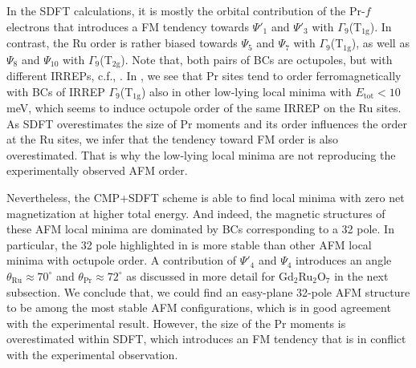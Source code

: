 \documentclass[10pt]{iopart}
\begin{document}
In the SDFT calculations, it is mostly the orbital contribution of the Pr-$f$ electrons that introduces a FM tendency towards $\Psi'_1$ and $\Psi'_3$ with $\Gamma_9$(T$_{1\mathrm{g}}$). In contrast, the Ru order is rather biased towards $\Psi_5$ and $\Psi_7$ with $\Gamma_9$(T$_{1\mathrm{g}}$), as well as $\Psi_8$ and $\Psi_{10}$ with $\Gamma_9$(T$_{2\mathrm{g}}$). Note that, both pairs of BCs are octupoles, but with different IRREPs, c.f., . In , we see that Pr sites tend to order ferromagnetically with BCs of IRREP $\Gamma_9$(T$_{1\mathrm{g}}$) also in other low-lying local minima with $E_{\mathrm{tot}} < 10\,$meV, which seems to induce octupole order of the same IRREP on the Ru sites. As SDFT overestimates the size of Pr moments and its order influences the order at the Ru sites, we infer that the tendency toward FM order is also overestimated.
That is why the low-lying local minima are not reproducing the experimentally observed AFM order.

Nevertheless, the CMP+SDFT scheme is able to find local minima with zero net magnetization at higher total energy. And indeed, the magnetic structures of these AFM local minima are dominated by BCs corresponding to a 32 pole. In particular, the 32 pole highlighted in  is more stable than other AFM local minima with octupole order. A contribution of $\Psi'_{4}$ and $\Psi_{4}$ introduces an angle $\theta_{\mathrm{Ru}}\approx70^{\circ}$ and $\theta_{\mathrm{Pr}}\approx72^{\circ}$ as discussed in more detail for Gd$_2$Ru$_2$O$_7$ in the next subsection. We conclude that, we could find an easy-plane 32-pole AFM structure to be among the most stable AFM configurations, which is in good agreement with the experimental result. However, the size of the Pr moments is overestimated within SDFT, which introduces an FM tendency that is in conflict with the experimental observation.
\end{document}
